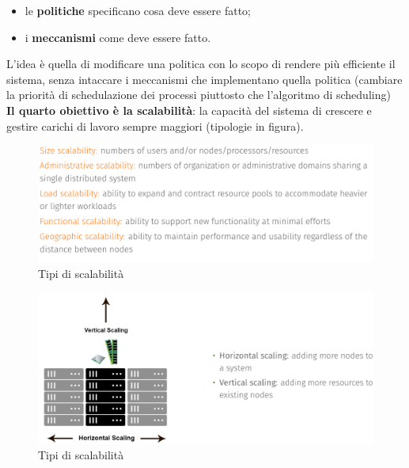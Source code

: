 \documentclass[12pt]{article}
\begin{document}
		\begin{itemize}
			\item  le \textbf{politiche} specificano cosa deve essere fatto;
			\item i \textbf{meccanismi} come deve essere fatto. 
		\end{itemize}
		L'idea è quella di modificare una politica con lo scopo di rendere più efficiente il sistema, senza intaccare i meccanismi che implementano quella politica (cambiare la priorità di schedulazione dei processi piuttosto che l'algoritmo di scheduling)\\
		\textbf{Il quarto obiettivo è la scalabilità}: la capacità del sistema di crescere e gestire carichi di lavoro sempre maggiori (tipologie in figura).
		\begin{figure}[h!]
			\centering
			\includegraphics[scale=0.30]{img/scalab.png}
			\caption{Tipi di scalabilità}
		\end{figure}
		\begin{figure}[h!]
			\centering
			\includegraphics[scale=0.30]{img/scalab1.png}
			\caption{Tipi di scalabilità}
		\end{figure}
\end{document}
